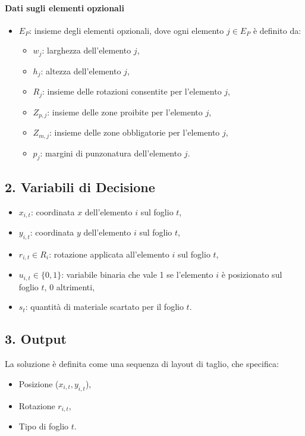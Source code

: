 \paragraph{Dati sugli elementi opzionali}  
\begin{itemize}
    \item \( E_P \): insieme degli elementi opzionali, dove ogni elemento \( j \in E_P \) è definito da:
    \begin{itemize}
        \item \( w_j \): larghezza dell’elemento \( j \),
        \item \( h_j \): altezza dell’elemento \( j \),
        \item \( R_j \): insieme delle rotazioni consentite per l’elemento \( j \),
        \item \( Z_{p,j} \): insieme delle zone proibite per l’elemento \( j \),
        \item \( Z_{m,j} \): insieme delle zone obbligatorie per l’elemento \( j \),
        \item \( p_j \): margini di punzonatura dell’elemento \( j \).
    \end{itemize}
\end{itemize}

\subsection*{2. Variabili di Decisione}
\begin{itemize}
    \item \( x_{i,t} \): coordinata \( x \) dell’elemento \( i \) sul foglio \( t \),
    \item \( y_{i,t} \): coordinata \( y \) dell’elemento \( i \) sul foglio \( t \),
    \item \( r_{i,t} \in R_i \): rotazione applicata all’elemento \( i \) sul foglio \( t \),
    \item \( u_{i,t} \in \{0,1\} \): variabile binaria che vale 1 se l’elemento \( i \) è posizionato sul foglio \( t \), 0 altrimenti,
    \item \( s_t \): quantità di materiale scartato per il foglio \( t \).
\end{itemize}

\subsection*{3. Output}
La soluzione è definita come una sequenza di layout di taglio, che specifica:
\begin{itemize}
    \item Posizione (\( x_{i,t}, y_{i,t} \)),
    \item Rotazione \( r_{i,t} \),
    \item Tipo di foglio \( t \).
\end{itemize}


